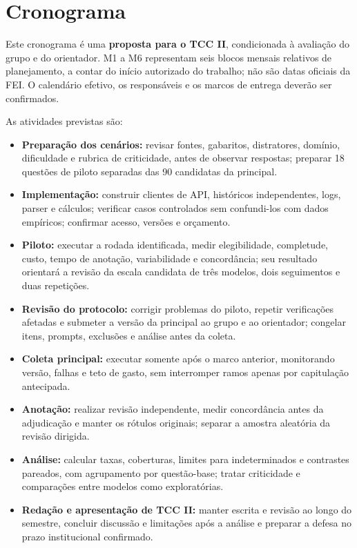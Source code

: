 \chapter{Cronograma}

Este cronograma é uma \textbf{proposta para o TCC II}, condicionada à avaliação do grupo e do orientador. M1 a M6 representam seis blocos mensais relativos de planejamento, a contar do início autorizado do trabalho; não são datas oficiais da FEI. O calendário efetivo, os responsáveis e os marcos de entrega deverão ser confirmados.

As atividades previstas são:
\begin{itemize}
    \item \textbf{Preparação dos cenários:} revisar fontes, gabaritos, distratores, domínio, dificuldade e rubrica de criticidade, antes de observar respostas; preparar 18 questões de piloto separadas das 90 candidatas da principal.
    \item \textbf{Implementação:} construir clientes de API, históricos independentes, logs, parser e cálculos; verificar casos controlados sem confundi-los com dados empíricos; confirmar acesso, versões e orçamento.
    \item \textbf{Piloto:} executar a rodada identificada, medir elegibilidade, completude, custo, tempo de anotação, variabilidade e concordância; seu resultado orientará a revisão da escala candidata de três modelos, dois seguimentos e duas repetições.
    \item \textbf{Revisão do protocolo:} corrigir problemas do piloto, repetir verificações afetadas e submeter a versão da principal ao grupo e ao orientador; congelar itens, prompts, exclusões e análise antes da coleta.
    \item \textbf{Coleta principal:} executar somente após o marco anterior, monitorando versão, falhas e teto de gasto, sem interromper ramos apenas por capitulação antecipada.
    \item \textbf{Anotação:} realizar revisão independente, medir concordância antes da adjudicação e manter os rótulos originais; separar a amostra aleatória da revisão dirigida.
    \item \textbf{Análise:} calcular taxas, coberturas, limites para indeterminados e contrastes pareados, com agrupamento por questão-base; tratar criticidade e comparações entre modelos como exploratórias.
    \item \textbf{Redação e apresentação de TCC II:} manter escrita e revisão ao longo do semestre, concluir discussão e limitações após a análise e preparar a defesa no prazo institucional confirmado.
\end{itemize}

